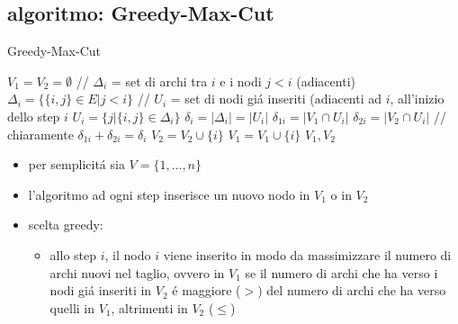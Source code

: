 \subsection*{algoritmo: Greedy-Max-Cut}
\begin{flushleft}
	\begin{algorithm}
		\caption{Greedy-Max-Cut}
		\begin{algorithmic}
			\STATE $V_1=V_2=\emptyset$
				\STATE \color{gray} // $\Delta_i$ = set di archi tra $i$ e i nodi $j<i$ (adiacenti) \color{black}
				\STATE $\Delta_i=\{\{i,j\}\in E\vert j<i\}$
				\STATE \color{gray} // $U_i$ = set di nodi gi\'a inseriti (adiacenti ad $i$, all'inizio dello step $i$ \color{black}
				\STATE $U_i=\{j\vert\{i,j\}\in\Delta_i\}$
				\STATE $\delta_i=\vert\Delta_i\vert=\vert U_i\vert$
				\STATE $\delta_{1i}=\vert V_1\cap U_i\vert$
				\STATE $\delta_{2i}=\vert V_2\cap U_i\vert$
				\STATE \color{gray} // chiaramente $\delta_{1i}+\delta_{2i}=\delta_i$ \color{black}
					\STATE $V_2=V_2\cup\{i\}$
				\ELSE
					\STATE $V_1=V_1\cup\{i\}$
				\ENDIF
			\ENDFOR
			\RETURN $V_1,V_2$
		\end{algorithmic}
	\end{algorithm}
	\begin{itemize}
		\item per semplicit\'a sia $V=\{1,\ldots,n\}$
		\item l'algoritmo ad ogni step inserisce un nuovo nodo in $V_1$ o in $V_2$
		\item scelta greedy:
		\begin{itemize}
			\item allo step $i$, il nodo $i$ viene inserito in modo da massimizzare il numero di archi nuovi nel taglio, ovvero in $V_1$ se il numero di archi che ha verso i nodi gi\'a inseriti in $V_2$ \'e maggiore ($>$) del numero di archi che ha verso quelli in $V_1$, altrimenti in $V_2$ ($\leq$)
		\end{itemize}
	\end{itemize}
\end{flushleft}


